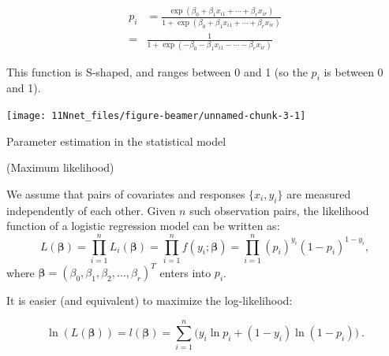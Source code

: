 \documentclass[10pt,ignorenonframetext,]{beamer}
\begin{document}
\begin{frame}

\begin{align*}p_i&= \frac{\exp(\beta_0+\beta_1 x_{i1}+\cdots + \beta_r x_{ir})}{1 + \exp(\beta_0 + \beta_1 x_{i1}+\cdots+\beta_r x_{ir})}\\=&\frac{1}{1+\exp(-\beta_0 - \beta_1 x_{i1}-\cdots-\beta_r x_{ir})}
\end{align*}

This function is S-shaped, and ranges between 0 and 1 (so the \(p_i\) is
between 0 and 1).

\begin{center}\texttt{[image: 11Nnet\_files/figure-beamer/unnamed-chunk-3-1]} \end{center}

\end{frame}

\begin{frame}

\begin{block}{Parameter estimation in the statistical model}

(Maximum likelihood) \vspace{2mm}

We assume that pairs of covariates and responses \(\{x_i, y_i\}\) are
measured independently of each other. Given \(n\) such observation
pairs, the likelihood function of a logistic regression model can be
written as:
\[L(\boldsymbol{\beta}) = \prod_{i=1}^n L_i(\boldsymbol{\beta}) = \prod_{i=1}^n f(y_i; \boldsymbol{\beta}) = \prod_{i=1}^n (p_i)^{y_i}(1-p_i)^{1-y_i},\]
where
\(\boldsymbol{\beta} = (\beta_0, \beta_1, \beta_2, \ldots, \beta_r)^T\)
enters into \(p_i\).

It is easier (and equivalent) to maximize the log-likelihood:

\[ \ln(L(\boldsymbol{\beta}))=l(\boldsymbol{\beta}) =\sum_{i=1}^n \Big ( y_i \ln p_i + (1-y_i) \ln(1 - p_i )\Big ) \ .\]

\end{block}

\end{frame}
\end{document}
